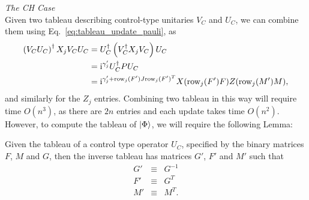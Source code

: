 \large{\itshape{The CH Case}}\\
Given two tableau describing control-type unitaries $V_{C}$ and $U_{C}$, we can combine them using Eq.~\ref{eq:tableau_update_pauli}, as 
\begin{align*}
\left(V_{C}U_{C}\right)^{\dagger} X_{j}V_{C}U_{C} &= U_{C}^{\dagger}\left(V_{C}^{\dagger} X_{j} V_{C}\right)U_{C}\\
&=\mathrm{i}^{\gamma'_{j}}U_{C}^{\dagger}P U_{C}\\
&= \mathrm{i}^{\gamma'_{j}+\text{row}_{j}(F')J\text{row}_{j}(F')^{T}}X(\text{row}_{j}(F')F)Z(\text{row}_{j}(M')M),
\end{align*}
and similarly for the $Z_{j}$ entries. Combining two tableau in this way will require time $O(n^{3})$, as there are $2n$ entries and each update takes time $O(n^{2})$. However, to compute the tableau of $\ket{\Phi}$, we will require the following Lemma:
\begin{lem}\label{lem:inverse_tableau}
Given the tableau of a control type operator $U_{C}$, specified by the binary matrices $F$, $M$ and $G$, then the inverse tableau has matrices $G'$, $F'$ and $M'$ such that
\begin{equation}
\begin{array}{rcl}
G' & \equiv & G^{-1}\\
F' & \equiv & G^{T} \\
M' & \equiv & M^{T}.\\
\end{array}
\end{equation}
\end{lem}
